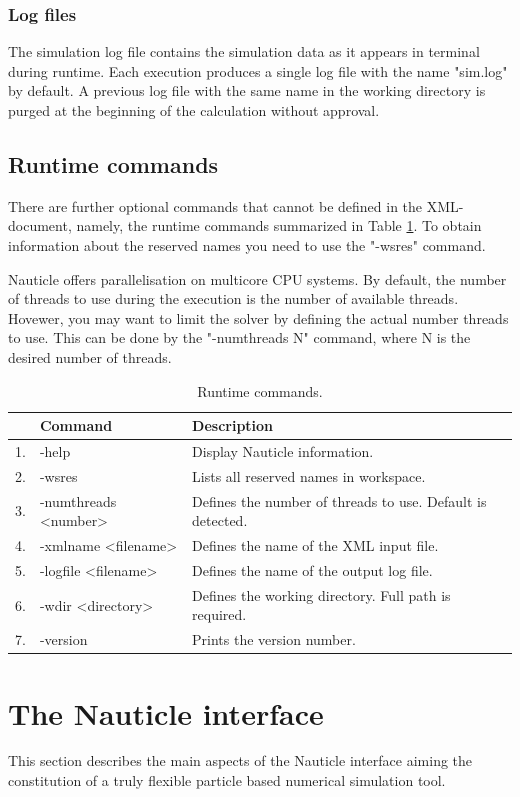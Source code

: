 \documentclass[a4paper,12pt,openany]{book}
\theoremstyle{break}
\begin{document}
\subsubsection{Log files}
The simulation log file contains the simulation data as it appears in terminal during runtime. Each execution produces a single log file with the name "sim.log" by default. A previous log file with the same name in the working directory is purged at the beginning of the calculation without approval.
\subsection{Runtime commands}
There are further optional commands that cannot be defined in the XML-document, namely, the runtime commands summarized in Table \ref{tbl:runtime_commands}. To obtain information about the reserved names you need to use the "-wsres" command.

Nauticle offers parallelisation on multicore CPU systems. By default, the number of threads to use during the execution is the number of available threads. Hovewer, you may want to limit the solver by defining the actual number threads to use. This can be done by the "-numthreads N" command, where N is the desired number of threads. 
\begin{table} [h]
\begin{center}
\caption{Runtime commands.} \label{tbl:runtime_commands}
\begin{tabular}{ l l l }
\toprule[1.5pt]
\bf  & \bf Command & \bf Description\\
\midrule
1. & -help & Display Nauticle information. \\
2. & -wsres & Lists all reserved names in workspace. \\
3. & -numthreads <number> & Defines the number of threads to use. Default is detected. \\
4. & -xmlname <filename> & Defines the name of the XML input file. \\
5. & -logfile <filename> & Defines the name of the output log file. \\
6. & -wdir <directory> & Defines the working directory. Full path is required. \\
7. & -version & Prints the version number. \\
\bottomrule[1.25pt]
\end{tabular}
\end{center}
\end{table}


\section{The Nauticle interface} \label{sec:interface}
This section describes the main aspects of the Nauticle interface aiming the constitution of a truly flexible particle based numerical simulation tool.
\end{document}
